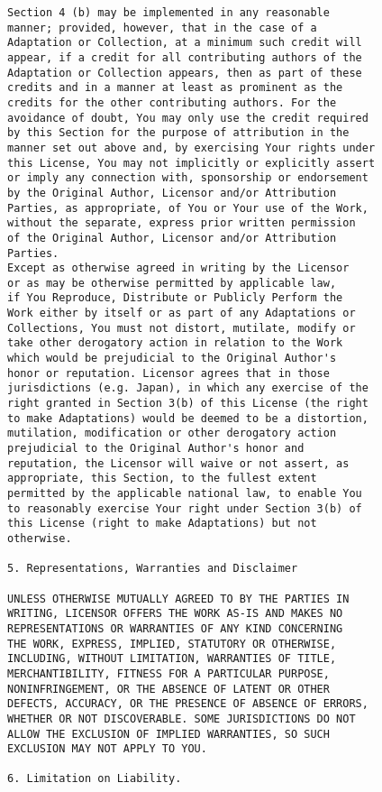 \begin{verbatim}
Section 4 (b) may be implemented in any reasonable
manner; provided, however, that in the case of a
Adaptation or Collection, at a minimum such credit will
appear, if a credit for all contributing authors of the
Adaptation or Collection appears, then as part of these
credits and in a manner at least as prominent as the
credits for the other contributing authors. For the
avoidance of doubt, You may only use the credit required
by this Section for the purpose of attribution in the
manner set out above and, by exercising Your rights under
this License, You may not implicitly or explicitly assert
or imply any connection with, sponsorship or endorsement
by the Original Author, Licensor and/or Attribution
Parties, as appropriate, of You or Your use of the Work,
without the separate, express prior written permission
of the Original Author, Licensor and/or Attribution
Parties.
Except as otherwise agreed in writing by the Licensor
or as may be otherwise permitted by applicable law,
if You Reproduce, Distribute or Publicly Perform the
Work either by itself or as part of any Adaptations or
Collections, You must not distort, mutilate, modify or
take other derogatory action in relation to the Work
which would be prejudicial to the Original Author's
honor or reputation. Licensor agrees that in those
jurisdictions (e.g. Japan), in which any exercise of the
right granted in Section 3(b) of this License (the right
to make Adaptations) would be deemed to be a distortion,
mutilation, modification or other derogatory action
prejudicial to the Original Author's honor and
reputation, the Licensor will waive or not assert, as
appropriate, this Section, to the fullest extent
permitted by the applicable national law, to enable You
to reasonably exercise Your right under Section 3(b) of
this License (right to make Adaptations) but not
otherwise.

5. Representations, Warranties and Disclaimer

UNLESS OTHERWISE MUTUALLY AGREED TO BY THE PARTIES IN
WRITING, LICENSOR OFFERS THE WORK AS-IS AND MAKES NO
REPRESENTATIONS OR WARRANTIES OF ANY KIND CONCERNING
THE WORK, EXPRESS, IMPLIED, STATUTORY OR OTHERWISE,
INCLUDING, WITHOUT LIMITATION, WARRANTIES OF TITLE,
MERCHANTIBILITY, FITNESS FOR A PARTICULAR PURPOSE,
NONINFRINGEMENT, OR THE ABSENCE OF LATENT OR OTHER
DEFECTS, ACCURACY, OR THE PRESENCE OF ABSENCE OF ERRORS,
WHETHER OR NOT DISCOVERABLE. SOME JURISDICTIONS DO NOT
ALLOW THE EXCLUSION OF IMPLIED WARRANTIES, SO SUCH
EXCLUSION MAY NOT APPLY TO YOU.

6. Limitation on Liability.


\end{verbatim}
